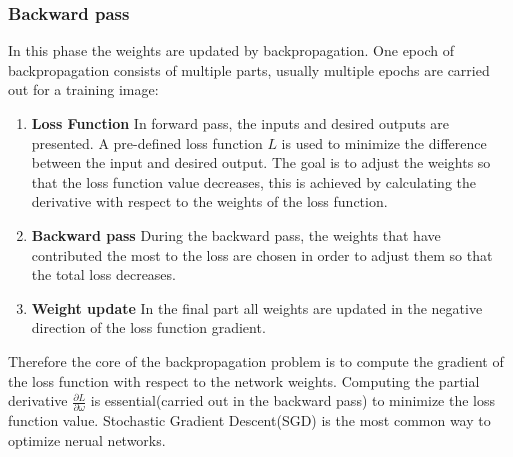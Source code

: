     \subsubsection{Backward pass}
    In this phase the weights are updated by backpropagation. One epoch of backpropagation consists of multiple parts, usually multiple epochs are carried out for a training image:
    \begin{enumerate}
        \item \textbf{Loss Function} In forward pass, the inputs and desired outputs are presented. A pre-defined loss function $L$ is used to minimize the difference between the input and desired output. The goal is to adjust the weights so that the loss function value decreases, this is achieved by calculating the derivative with respect to the weights of the loss function.
        \item \textbf{Backward pass} During the backward pass, the weights that have contributed the most to the loss are chosen in order to adjust them so that the total loss decreases.
        \item \textbf{Weight update} In the final part all weights are updated in the negative direction of the loss function gradient.
    \end{enumerate}
    
    Therefore the core of the backpropagation problem is to compute the gradient of the loss function with respect to the network weights. Computing the partial derivative $\frac{\partial L}{\partial \omega}$ is essential(carried out in the backward pass) to minimize the loss function value. Stochastic Gradient Descent(SGD) is the most common way to optimize nerual networks.

